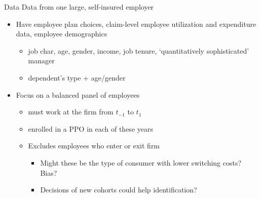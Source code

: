 \begin{frame}{Data}
Data from one large, self-insured employer

\begin{itemize}
\item Have employee plan choices, claim-level employee utilization and
expenditure data, employee demographics

\begin{itemize}
\item job char, age, gender, income, job tenure, `quantitatively
sophisticated' manager

\item dependent's type + age/gender
\end{itemize}

\item Focus on a balanced panel of employees

\begin{itemize}
\item must work at the firm from $t_{-1}$ to $t_{1}$

\item enrolled in a PPO in each of these years

\item Excludes employees who enter or exit firm

\begin{itemize}
\item Might these be the type of consumer with lower switching costs? Bias?

\item Decisions of new cohorts could help identification?
\end{itemize}
\end{itemize}
\end{itemize}
\end{frame}


